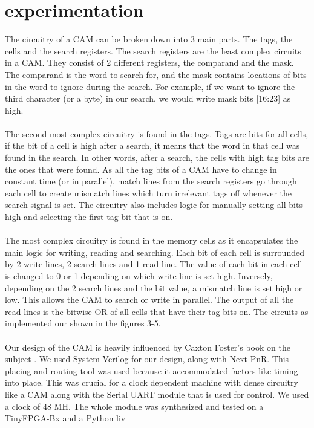 \section{experimentation}
The circuitry of a CAM can be broken down into 3 main parts. The tags, the cells and the search registers. 
The search registers are the least complex circuits in a CAM. They consist of 2 different registers, the comparand and the mask. 
The comparand is the word to search for, and the mask contains locations of bits in the word to ignore during the search.
For example, if we want to ignore the third character (or a byte) in our search, we would write mask bits [16:23] as high.
\\\\
The second most complex circuitry is found in the tags.
Tags are bits for all cells, if the bit of a cell is high after a search, it means that the word in that cell was found in the search. 
In other words, after a search, the cells with high tag bits are the ones that were found. 
As all the tag bits of a CAM have to change in constant time (or in parallel), match lines from the search registers go through each cell to create mismatch lines which turn irrelevant tags off whenever the search signal is set.
The circuitry also includes logic for manually setting all bits high and selecting the first tag bit that is on.
\\\\
The most complex circuitry is found in the memory cells as it encapsulates the main logic for writing, reading and searching. 
Each bit of each cell is surrounded by 2 write lines, 2 search lines and 1 read line. 
The value of each bit in each cell is changed to 0 or 1 depending on which write line is set high. 
Inversely, depending on the 2 search lines and the bit value, a mismatch line is set high or low. 
This allows the CAM to search or write in parallel. 
The output of all the read lines is the bitwise OR of all cells that have their tag bits on. 
The circuits as implemented our shown in the figures 3-5. 
\\\\
Our design of the CAM is heavily influenced by Caxton Foster's book on the subject \cite{capp}.
We used System Verilog for our design, along with Next PnR. 
This placing and routing tool was used because it accommodated factors like timing into place. 
This was crucial for a clock dependent machine with dense circuitry like a CAM along with the Serial UART module that is used for control. 
We used a clock of 48 MH. The whole module was synthesized and tested on a TinyFPGA-Bx and a Python liv